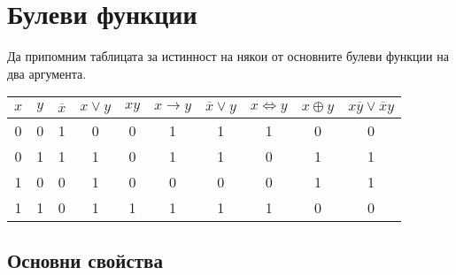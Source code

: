 \chapter{Булеви функции}


Да припомним таблицата за истинност на някои от основните булеви функции на два аргумента.

\begin{tabular}{|c|c|c|c|c|c|c|c|c|c|}
  \hline
  $x$ & $y$ & $\overline{x}$ & $x \vee y$ & $xy$ & $x \rightarrow y$ & $\overline{x}\vee y$ & $x \iff y$ & $x \oplus y$ & $x\overline{y} \vee \overline{x}y$\\
  \hline
  \hline
  0 & 0 & 1 & 0 & 0 & 1 & 1 & 1 & 0 & 0 \\
  \hline
  0 & 1 & 1 & 1 & 0 & 1 & 1 & 0 & 1 & 1 \\
  \hline
  1 & 0 & 0 & 1 & 0 & 0 & 0 & 0 & 1 & 1 \\
  \hline
  1 & 1 & 0 & 1 & 1 & 1 & 1 & 1 & 0 & 0 \\
  \hline
\end{tabular}

\section{Основни свойства}

